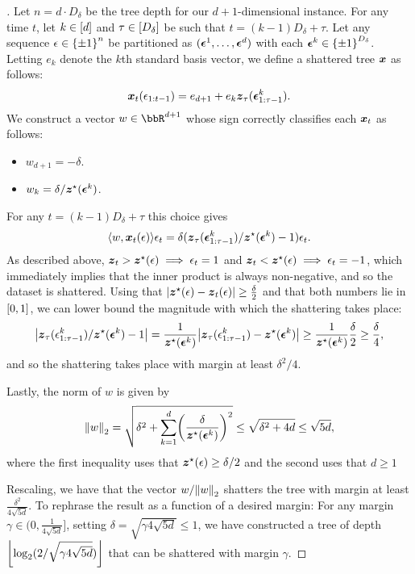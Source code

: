 \begin{proof}[]
Let $n=d\cdot{}D_{\delta}$ be the tree depth for our $d+1$-dimensional instance. For any time $t$, let $k\in\brk{d}$ and $\tau\in\brk{D_{\delta}}$ be such that $t=(k-1)D_{\delta} + \tau$. Let any sequence $\eps\in\pmo^{n}$ be partitioned as $(\mb{\eps}^{1},\ldots,\mb{\eps}^{d})$ with each $\mb{\eps}^{k}\in{}\pmo^{D_{\delta}}$. Letting $e_k$ denote the $k$th standard basis vector, we define a shattered tree $\mb{x}$ as follows:
\[
\mb{x}_{t}(\eps_{1:t-1}) = e_{d+1} + e_{k}\mb{z}_{\tau}(\mb{\eps}^{k}_{1:\tau-1}).
\]
We construct a vector $w\in\bbR^{d+1}$ whose sign correctly classifies each $\mb{x}_t$ as follows:
\begin{itemize}
\item $w_{d+1}=-\delta$.
\item $w_{k}=\delta/\mb{z}^{\star}(\mb{\eps}^{k})$.
\end{itemize}
For any $t=(k-1)D_{\delta} + \tau$ this choice gives
\[
\tri*{w, \mb{x}_{t}(\eps)}\eps_t = \delta(\mb{z}_{\tau}(\mb{\eps}^{k}_{1:\tau-1})/\mb{z}^{\star}(\mb{\eps}^{k})-1)\eps_t.
\]
As described above, $\mb{z}_t>\mb{z}^{\star}(\eps)\implies{}\eps_t=1$ and $\mb{z}_t<\mb{z}^{\star}(\eps)\implies\eps_t=-1$, which immediately implies that the inner product is always non-negative, and so the dataset is shattered. Using that $\abs*{\mb{z}^{\star}(\eps)-\mb{z}_t(\eps)}\geq{}\frac{\delta}{2}$ and that both numbers lie in $\brk*{0,1}$, we can lower bound the magnitude with which the shattering takes place:
\[
\abs*{\mb{z}_{\tau}(\eps^{k}_{1:\tau-1})/\mb{z}^{\star}(\mb{\eps}^{k})-1} = \frac{1}{\mb{z}^{\star}(\mb{\eps}^{k})}\abs*{\mb{z}_{\tau}(\eps^{k}_{1:\tau-1})-\mb{z}^{\star}(\mb{\eps}^{k})}\geq{}\frac{1}{\mb{z}^{\star}(\mb{\eps}^{k})}\frac{\delta}{2}\geq{}\frac{\delta}{4},
\]
and so the shattering takes place with margin at least $\delta^{2}/4$.

Lastly, the norm of $w$ is given by
\[
\nrm*{w}_{2}=\sqrt{\delta^{2} + \sum_{k=1}^{d}\prn*{\frac{\delta}{\mb{z}^{\star}(\mb{\eps}^{k})}}^{2}}
\leq{} \sqrt{\delta^{2} + 4d} \leq{} \sqrt{5d},
\]
where the first inequality uses that $\mb{z}^{\star}(\eps)\geq{}\delta/2$ and the second uses that $d\geq{}1$

Rescaling, we have that the vector $w/\nrm*{w}_{2}$ shatters the tree with margin at least $\frac{\delta^{2}}{4\sqrt{5d}}$. To rephrase the result as a function of a desired margin: For any margin $\gamma\in(0,\frac{1}{4\sqrt{5d}}]$, setting $\delta=\sqrt{\gamma4\sqrt{5d}}\leq{}1$, we have constructed a tree of depth $\floor*{\log_{2}(2/\sqrt{\gamma4\sqrt{5d}})}$ that can be shattered with margin $\gamma$.

\end{proof}

